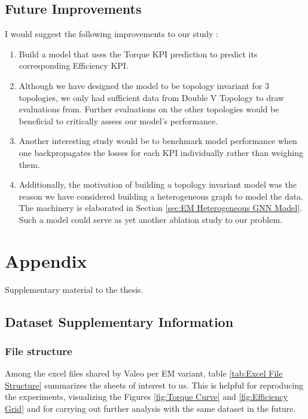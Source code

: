 \documentclass{report} %
\begin{document}
\section{Future Improvements}\label{sec:Future Improvements}
I would suggest the following improvements to our study : 

\begin{enumerate}
    \item Build a model that uses the Torque \ac{KPI} prediction to predict its corresponding Efficiency \ac{KPI}. 
    \item Although we have designed the model to be topology invariant for 3 topologies, we only had sufficient data from Double V Topology to draw evaluations from.
    Further evaluations on the other topologies would be beneficial to critically assess our model's performance.
    \item Another interesting study would be to benchmark model performance when one backpropagates the losses for each \ac{KPI} individually rather than weighing them.
    \item Additionally, the motivation of building a topology invariant model was the reason we have considered building a heterogeneous graph to model the data. The machinery is elaborated in Section \ref{sec:EM Heterogeneous GNN Model}.
    Such a model could serve as yet another ablation study to our problem.
\end{enumerate}

\newpage 

\appendix
\chapter{Appendix}
Supplementary material to the thesis.

\section{Dataset Supplementary Information}
\label{sec:Dataset Supplementary Information}
\subsection{File structure}
\label{subsec:File structure}
Among the excel files shared by Valeo per \ac{EM} variant, table \ref{tab:Excel File Structure} summarizes the sheets of interest to us.
This is helpful for reproducing the experiments, visualizing the Figures \ref{fig:Torque Curve} and \ref{fig:Efficiency Grid} and for carrying out further analysis 
with the same dataset in the future.
\end{document}
